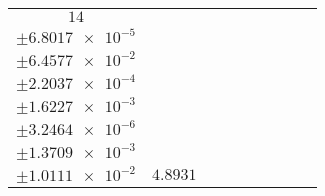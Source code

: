 \documentclass[8pt]{article}
\begin{document}
\begin{longtable}[l]{c c c c c c c c c}
$\num{14}$ & \begin{tabular}[c]{@{}c@{}}$\num{6.084e-2}$ \\ $\pm\num{6.8017e-5}$\end{tabular} & \begin{tabular}[c]{@{}c@{}}$\num{0.14567}$ \\ $\pm\num{6.4577e-2}$\end{tabular} & \begin{tabular}[c]{@{}c@{}}$\num{3.3751}$ \\ $\pm\num{2.2037e-4}$\end{tabular} & \begin{tabular}[c]{@{}c@{}}$\num{1.9843e+3}$ \\ $\pm\num{1.6227e-3}$\end{tabular} & \begin{tabular}[c]{@{}c@{}}$\num{3.9697}$ \\ $\pm\num{3.2464e-6}$\end{tabular} & \begin{tabular}[c]{@{}c@{}}$\num{1.1672}$ \\ $\pm\num{1.3709e-3}$\end{tabular} & \begin{tabular}[c]{@{}c@{}}$\num{4.1368}$ \\ $\pm\num{1.0111e-2}$\end{tabular} & $\num{4.8931}$\\
\bottomrule
\end{longtable}
\end{document}
